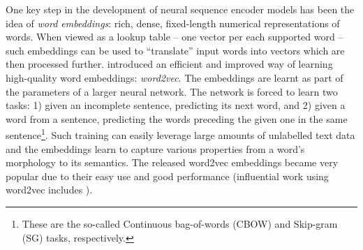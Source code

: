 \documentclass[bsc,frontabs,twoside,singlespacing,parskip,deptreport]{infthesis}
\begin{document}
{{    One key step in the development of neural sequence encoder models has been the idea of \textit{word embeddings}: rich, dense, fixed-length numerical representations of words. When viewed as a lookup table -- one vector per each supported word -- such embeddings can be used to ``translate'' input words into vectors which are then processed further.
    \citet{Mikolov_2013} introduced an efficient and improved way of learning high-quality word embeddings: \textit{word2vec}. The embeddings are learnt as part of the parameters of a larger neural network. The network is forced to learn two tasks: 1) given an incomplete sentence, predicting its next word, and 2) given a word from a sentence, predicting the words preceding the given one in the same sentence\footnote{These are the so-called Continuous bag-of-words (CBOW) and Skip-gram (SG) tasks, respectively.}. Such training can easily leverage large amounts of unlabelled text data and the embeddings learn to capture various properties from a word's morphology to its semantics. The released word2vec embeddings became very popular due to their easy use and good performance (influential work using word2vec includes \citet{Lample_2016,Kiros_2015,Dos_2014,Kusner_2015}).

}}
\end{document}
